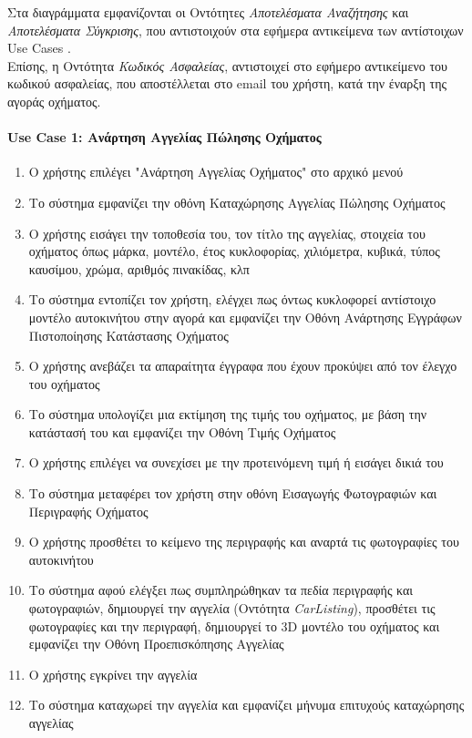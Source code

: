 \documentclass{../ol-softwaremanual}
\begin{document}
	Στα διαγράμματα εμφανίζονται οι Οντότητες \textit{Αποτελέσματα Αναζήτησης} και \textit{Αποτελέσματα Σύγκρισης}, που αντιστοιχούν στα εφήμερα αντικείμενα των αντίστοιχων \en  Use Cases \gr. \\
	
	Επίσης, η Οντότητα \textit{Κωδικός Ασφαλείας}, αντιστοιχεί στο εφήμερο αντικείμενο του κωδικού ασφαλείας, που αποστέλλεται στο \en email \gr του χρήστη, κατά την έναρξη της αγοράς οχήματος.
	
	
	\newpage
	
	\paragraph{\en Use Case 1: \gr Ανάρτηση Αγγελίας Πώλησης Οχήματος}
	\centering
	
	\begin{enumerate}
	
	\item Ο χρήστης επιλέγει \en"\gr Ανάρτηση Αγγελίας Οχήματος\en" \gr στο αρχικό μενού
	\item Το σύστημα εμφανίζει την οθόνη Καταχώρησης Αγγελίας Πώλησης Οχήματος
	\item Ο χρήστης εισάγει την τοποθεσία του, τον τίτλο της αγγελίας, στοιχεία του οχήματος όπως μάρκα, μοντέλο, έτος κυκλοφορίας, χιλιόμετρα, κυβικά, τύπος καυσίμου, χρώμα, αριθμός πινακίδας, κλπ
	\item Το σύστημα εντοπίζει τον χρήστη, ελέγχει πως όντως κυκλοφορεί αντίστοιχο μοντέλο αυτοκινήτου στην αγορά και εμφανίζει την Οθόνη Ανάρτησης Εγγράφων Πιστοποίησης Κατάστασης Οχήματος
	\item Ο χρήστης ανεβάζει τα απαραίτητα έγγραφα που έχουν προκύψει από τον έλεγχο του οχήματος		
	\item Το σύστημα υπολογίζει μια εκτίμηση της τιμής του οχήματος, με βάση την κατάστασή του και εμφανίζει την Οθόνη Τιμής Οχήματος
	\item Ο χρήστης επιλέγει να συνεχίσει με την προτεινόμενη τιμή ή εισάγει δικιά του
	\item Το σύστημα μεταφέρει τον χρήστη στην οθόνη Εισαγωγής Φωτογραφιών και Περιγραφής Οχήματος
	\item Ο χρήστης προσθέτει το κείμενο της περιγραφής και αναρτά τις φωτογραφίες του αυτοκινήτου
	\item Το σύστημα αφού ελέγξει πως συμπληρώθηκαν τα πεδία περιγραφής και φωτογραφιών, δημιουργεί την αγγελία (Οντότητα \en \textit{CarListing}\gr), προσθέτει τις φωτογραφίες και την περιγραφή, δημιουργεί το \en 3D \gr μοντέλο του οχήματος και εμφανίζει την Οθόνη Προεπισκόπησης Αγγελίας
	\item Ο χρήστης εγκρίνει την αγγελία
	\item Το σύστημα καταχωρεί την αγγελία και εμφανίζει μήνυμα επιτυχούς καταχώρησης αγγελίας
\end{enumerate}
	
\end{document}
